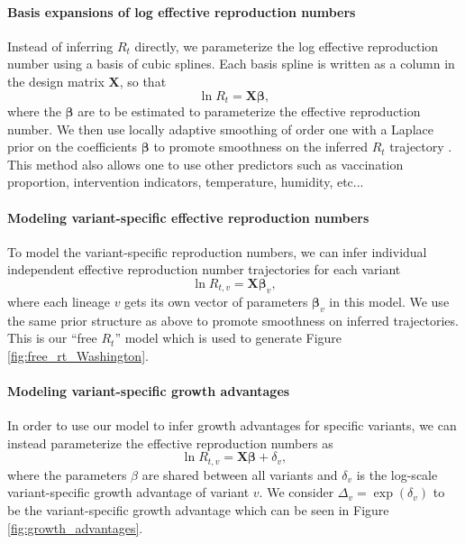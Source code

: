 \documentclass[11pt,oneside,letterpaper]{article}
\renewcommand{\vec}[1]{\boldsymbol{#1}}
\begin{document}
\paragraph{Basis expansions of log effective reproduction numbers}%

Instead of inferring $R_{t}$ directly, we parameterize the log effective reproduction number using a basis of cubic splines.
Each basis spline is written as a column in the design matrix $\vec{X}$, so that
\begin{equation}
  \ln R_{t} = \vec{X} \vec{\beta},
\end{equation}
where the $\vec{\beta}$ are to be estimated to parameterize the effective reproduction number.
We then use locally adaptive smoothing of order one with a Laplace prior on the coefficients $\vec{\beta}$ to promote smoothness on the inferred $R_t$ trajectory \cite{Faulkner2018}.
This method also allows one to use other predictors such as vaccination proportion, intervention indicators, temperature, humidity, etc...

\paragraph{Modeling variant-specific effective reproduction numbers}%

To model the variant-specific reproduction numbers, we can infer individual independent effective reproduction number trajectories for each variant
\begin{equation}
  \ln R_{t, v} = \vec{X} \vec{\beta}_{v},
\end{equation}
where each lineage $v$ gets its own vector of parameters $\vec{\beta}_{v}$ in this model.
We use the same prior structure as above to promote smoothness on inferred trajectories. This is our ``free $R_{t}$'' model which is used to generate Figure \ref{fig:free_rt_Washington}.

\paragraph{Modeling variant-specific growth advantages}%

In order to use our model to infer growth advantages for specific variants, we can instead parameterize the effective reproduction numbers as
\begin{equation}
\ln R_{t,v} = \vec{X} \vec{\beta} + \delta_{v},
\end{equation}
where the parameters $\beta$ are shared between all variants and $\delta_{v}$ is the log-scale variant-specific growth advantage of variant $v$.
We consider $\Delta_{v} = \exp(\delta_{v})$ to be the variant-specific growth advantage which can be seen in Figure \ref{fig:growth_advantages}.
\end{document}
